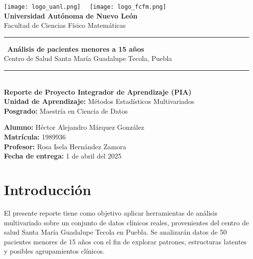 \documentclass[12pt]{report}
\begin{document}
\begin{titlepage}
    \begin{center}
        \texttt{[image: logo\_uanl.png]}~\hfill~
        \texttt{[image: logo\_fcfm.png]} \\[1cm]

        {\Large \textbf{Universidad Autónoma de Nuevo León}} \\
        {\large Facultad de Ciencias Físico Matemáticas} \\[1cm]

        \rule{\linewidth}{0.5mm} \
        {\LARGE \textbf{Análisis de pacientes menores a 15 años}} \\[0.4cm]
        {\large Centro de Salud Santa María Guadalupe Tecola, Puebla} \\
        \rule{\linewidth}{0.5mm} \\[1cm]

        \textbf{Reporte de Proyecto Integrador de Aprendizaje (PIA)}\\
        \textbf{Unidad de Aprendizaje:} Métodos Estadísticos Multivariados \\
        \textbf{Posgrado:} Maestría en Ciencia de Datos \\

        \vfill
        \begin{flushright}
        \textbf{Alumno:} Héctor Alejandro Márquez González\\
        \textbf{Matrícula:} 1989936\\
        \textbf{Profesor:} Rosa Isela Hernández Zamora\\
        \textbf{Fecha de entrega:} 1 de abril del 2025
        \end{flushright}
    \end{center}
\end{titlepage}

\tableofcontents
\newpage

\chapter{Introducción}
El presente reporte tiene como objetivo aplicar herramientas de análisis multivariado sobre un conjunto de datos clínicos reales, provenientes del centro de salud Santa María Guadalupe Tecola en Puebla. Se analizarán datos de 50 pacientes menores de 15 años con el fin de explorar patrones, estructuras latentes y posibles agrupamientos clínicos.
\end{document}
